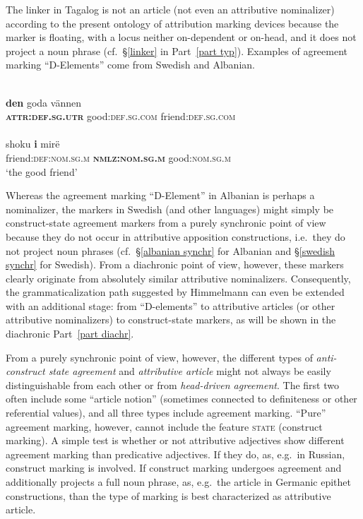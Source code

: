 The linker in Tagalog is not an article (not even an attributive nominalizer) according to the present ontology of attribution marking devices because the marker is floating, with a locus neither on-dependent or on-head, and it does not project a noun phrase (cf.~\S\ref{linker} in Part~\ref{part typ}). Examples of agreement marking “D-Elements” come from Swedish and Albanian.
\begin{exe}
\ex
\begin{xlist}
\ex 
{}\\
\gll	\textbf{den} goda vännen\\
	\textbf{\textsc{attr:def.sg.utr}} good:\textsc{def.sg.com} friend:\textsc{def.sg.com}\\
\ex 
{}\\
\gll	shoku \textbf{i} mirë\\
	friend:\textsc{def:nom.sg.m} \textbf{\textsc{nmlz:nom.sg.m}} good:\textsc{nom.sg.m}\\
\glt	‘the good friend’
\end{xlist}
\end{exe}
Whereas the agreement marking “D-Element” in Albanian is perhaps a nominalizer, the markers in Swedish (and other languages) might simply be construct-state agreement markers from a purely synchronic point of view because they do not occur in attributive apposition constructions, i.e.~they do not project noun phrases (cf.~\S\ref{albanian synchr} for Albanian and \S\ref{swedish synchr} for Swedish). From a diachronic point of view, however, these markers clearly originate from absolutely similar attributive nominalizers. Consequently, the grammaticalization path suggested by Himmelmann \citeyear{himmelmann1997} can even be extended with an additional stage: from “D-elements” to attributive articles (or other attributive nominalizers) to construct-state markers, as will be shown in the diachronic Part~\ref{part diachr}.

From a purely synchronic point of view, however, the different types of \emph{anti-construct state agreement} and \emph{attributive article} might not always be easily distinguishable from each other or from \emph{head-driven agreement}. The first two often include some “article notion” (sometimes connected to definiteness or other referential values), and all three types include agreement marking. “Pure” agreement marking, however, cannot include the feature \textsc{state} (construct marking). A simple test is whether or not attributive adjectives show different agreement marking than predicative adjectives. If they do, as, e.g.~in Russian, construct marking is involved. If construct marking undergoes agreement and additionally projects a full noun phrase, as, e.g.~the article in Germanic epithet constructions, than the type of marking is best characterized as attributive article.

